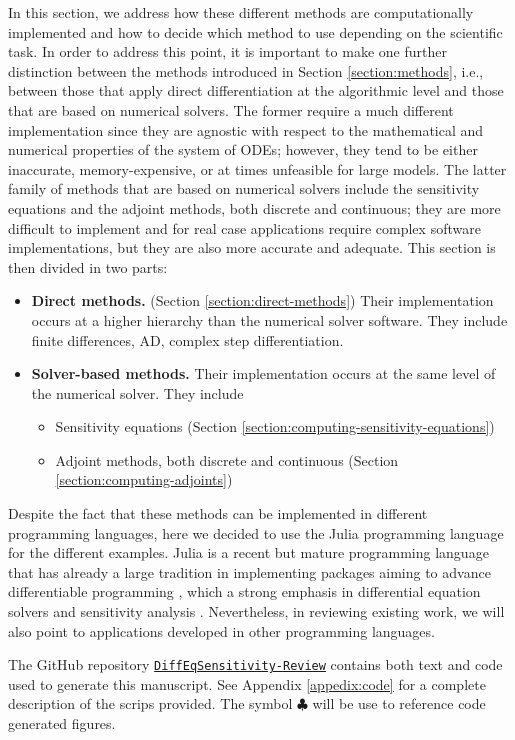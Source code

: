 
In this section, we address how these different methods are computationally implemented and how to decide which method to use depending on the scientific task.
In order to address this point, it is important to make one further distinction between the methods introduced in Section \ref{section:methods}, i.e., between those that apply direct differentiation at the algorithmic level and those that are based on numerical solvers.  
The former require a much different implementation since they are agnostic with respect to the mathematical and numerical properties of the system of ODEs; however, they tend to be either inaccurate, memory-expensive, or at times unfeasible for large models. 
The latter family of methods that are based on numerical solvers include the sensitivity equations and the adjoint methods, both discrete and continuous; they are more difficult to implement and for real case applications require complex software implementations, but they are also more accurate and adequate. 
This section is then divided in two parts:
\begin{itemize}
    \item \textbf{Direct methods.} (Section \ref{section:direct-methods}) Their implementation occurs at a higher hierarchy than the numerical solver software. They include finite differences, AD, complex step differentiation.
    \item \textbf{Solver-based methods.} Their implementation occurs at the same level of the numerical solver. They include 
    \begin{itemize}
        \item Sensitivity equations (Section \ref{section:computing-sensitivity-equations})
        \item Adjoint methods, both discrete and continuous (Section \ref{section:computing-adjoints})
    \end{itemize}
\end{itemize}
Despite the fact that these methods can be implemented in different programming languages, here we decided to use the Julia programming language for the different examples. 
Julia is a recent but mature programming language that has already a large tradition in implementing packages aiming to advance differentiable programming \cite{Bezanson_Karpinski_Shah_Edelman_2012, Julialang_2017}, which a strong emphasis in differential equation solvers \cite{Rackauckas_Nie_2016} and sensitivity analysis \cite{rackauckas2020universal}.
Nevertheless, in reviewing existing work, we will also point to applications developed in other programming languages.

The GitHub repository \href{https://github.com/ODINN-SciML/DiffEqSensitivity-Review}{\texttt{DiffEqSensitivity-Review}} contains both text and code used to generate this manuscript. 
See Appendix \ref{appedix:code} for a complete description of the scrips provided. 
The symbol $\clubsuit$ will be use to reference code generated figures. 